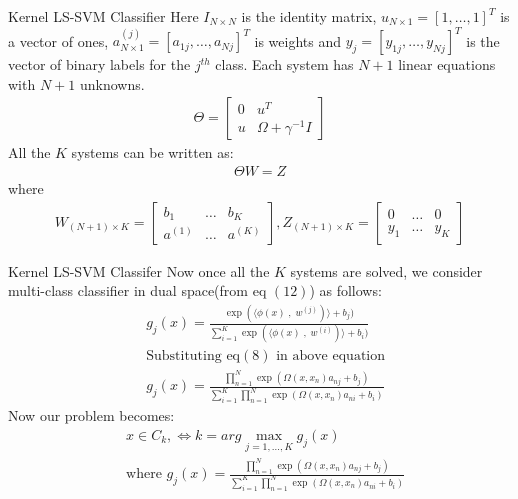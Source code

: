 \documentclass{beamer}
\begin{document}
    \begin{frame}{Kernel LS-SVM Classifier}
        Here $I_{N \times N}$ is the identity matrix, $u_{N \times 1} = [1,\ldots,1]^{T}$ is a vector of ones,
        $a^{(j)}_{N \times 1} = [a_{1j}, \ldots, a_{Nj}]^{T}$ is weights and $y_{j} = [y_{1j}, \ldots, y_{Nj}]^{T}$ is the
        vector of binary labels for the $j^{th}$ class.
        Each system has $N+1$ linear equations with $N+1$ unknowns.
        \begin{align}
            \Theta = \begin{bmatrix}
                         0 & u^{T}                 \\
                         u & \Omega + \gamma^{-1}I
            \end{bmatrix}
        \end{align}
        All the $K$ systems can be written as:
        \begin{align}
            \Theta W = Z
        \end{align}
        where
        \begin{align*}
            W_{(N+1) \times K} = \begin{bmatrix}
                                     b_{1}   & \ldots & b_{K}   \\
                                     a^{(1)} & \ldots & a^{(K)}
            \end{bmatrix}
            , Z_{(N+1) \times K} = \begin{bmatrix}
                                       0     & \ldots & 0     \\
                                       y_{1} & \ldots & y_{K}
            \end{bmatrix}
        \end{align*}
    \end{frame}
    \begin{frame}{Kernel LS-SVM Classifer}
        Now once all the $K$ systems are solved, we consider multi-class classifier in dual space(from eq $(12)$) as follows:
        \begin{align*}
            &g_{j}(x) = \frac{\exp(\langle \phi(x)\;,\; w^{(j)})\rangle + b_{j})}{\sum_{i=1}^{K} \exp(\langle \phi(x)\;,\; w^{(i)})\rangle + b_{i})}\\
            &\text{Substituting eq$(8)$ in above equation} \\
            &g_{j}(x) = \frac{\prod_{n=1}^{N}\exp(\Omega(x,x_{n})a_{nj} + b_{j})}{\sum_{i=1}^{K} \prod_{n=1}^{N}\exp(\Omega(x,x_{n})a_{ni} + b_{i})}
        \end{align*}
        Now our problem becomes:
        \begin{align*}
            & x \in C_{k}, \Leftrightarrow k= arg \max_{j=1,\ldots,K} g_{j}(x)\\
            & \text{where } g_{j}(x) = \frac{\prod_{n=1}^{N}\exp(\Omega(x,x_{n})a_{nj} + b_{j})}{\sum_{i=1}^{K} \prod_{n=1}^{N}\exp(\Omega(x,x_{n})a_{ni} + b_{i})}
        \end{align*}

    \end{frame}
\end{document}
